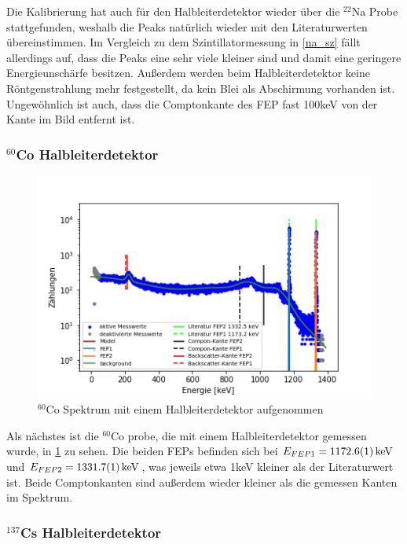 Die Kalibrierung hat auch für den Halbleiterdetektor wieder über die $^{22}$Na Probe stattgefunden, weshalb die Peaks natürlich wieder mit den Literaturwerten übereinstimmen. Im Vergleich zu dem Szintillatormessung in \cref{na_sz} fällt allerdings auf, dass die Peaks eine sehr viele kleiner sind und damit eine geringere Energieunschärfe besitzen. Außerdem werden beim Halbleiterdetektor keine Röntgenstrahlung mehr festgestellt, da kein Blei als Abschirmung vorhanden ist. Ungewöhnlich ist auch, dass die Comptonkante des FEP fast 100keV von der Kante im Bild entfernt ist.



\newpage
\subsubsection{$^{60}$Co Halbleiterdetektor}


\begin{figure}[ht]
	\centering
	\includegraphics[scale=0.8]{co_pn_.png}
	\caption{$^{60}$Co Spektrum mit einem Halbleiterdetektor aufgenommen}
	\label{co_pn}
\end{figure}


Als nächstes ist die $^{60}$Co probe, die mit einem Halbleiterdetektor gemessen wurde, in \cref{co_pn} zu sehen. Die beiden FEPs befinden sich bei $E_{FEP1} = \SI{1172,6 \pm 0,1}{keV}$ und $E_{FEP2} = \SI{1331,7 \pm 0,1}{keV}$, was jeweils etwa 1keV kleiner als der Literaturwert ist. Beide Comptonkanten sind außerdem wieder kleiner als die gemessen Kanten im Spektrum. 

\newpage
\subsubsection{$^{137}$Cs Halbleiterdetektor}

